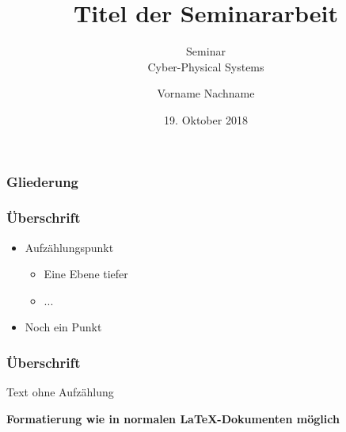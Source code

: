 \documentclass{sikslides}
\title[Kurztitel]{Titel der Seminararbeit}
\subtitle{Seminar \\Cyber-Physical Systems} %
\author{Vorname Nachname}
\date[19.10.2018]{19. Oktober 2018}
\begin{document}
\titleframe

\begin{frame}
    \frametitle{Gliederung}
    \tableofcontents[hideallsubsections]
\end{frame}


\begin{frame}
  \frametitle{Überschrift}
  \begin{itemize}
  \item Aufzählungspunkt
    \begin{itemize}
    \item Eine Ebene tiefer
    \item ...


    \end{itemize}
  \item Noch ein Punkt
  \end{itemize}
\end{frame}

\begin{frame}
    \frametitle{Überschrift}
    Text ohne Aufzählung
    \vfill
    \begin{center}
        \Large\textbf{Formatierung wie in normalen \LaTeX-Dokumenten möglich}
    \end{center}
\end{frame}
\end{document}
